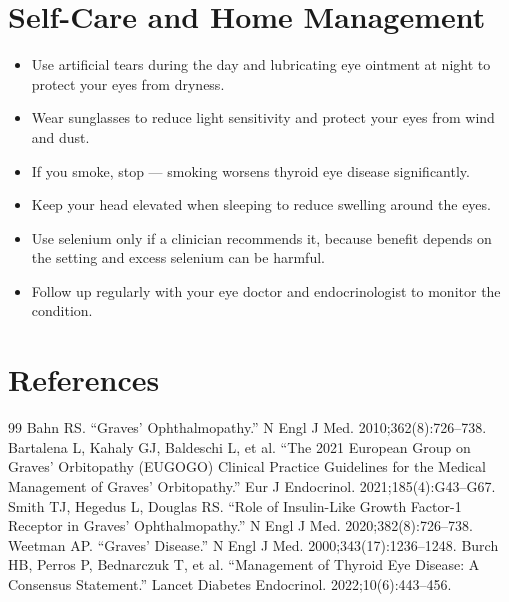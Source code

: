 \section*{Self-Care and Home Management}
\begin{itemize}
  \item Use artificial tears during the day and lubricating eye ointment at night to protect your eyes from dryness.
  \item Wear sunglasses to reduce light sensitivity and protect your eyes from wind and dust.
  \item If you smoke, stop — smoking worsens thyroid eye disease significantly.
  \item Keep your head elevated when sleeping to reduce swelling around the eyes.
  \item Use selenium only if a clinician recommends it, because benefit depends on the setting and excess selenium can be harmful.
  \item Follow up regularly with your eye doctor and endocrinologist to monitor the condition.
\end{itemize}

\section*{References}
\begin{thebibliography}{99}
 Bahn RS. ``Graves' Ophthalmopathy.'' N Engl J Med. 2010;362(8):726--738.
 Bartalena L, Kahaly GJ, Baldeschi L, et al. ``The 2021 European Group on Graves' Orbitopathy (EUGOGO) Clinical Practice Guidelines for the Medical Management of Graves' Orbitopathy.'' Eur J Endocrinol. 2021;185(4):G43--G67.
 Smith TJ, Hegedus L, Douglas RS. ``Role of Insulin-Like Growth Factor-1 Receptor in Graves' Ophthalmopathy.'' N Engl J Med. 2020;382(8):726--738.
 Weetman AP. ``Graves' Disease.'' N Engl J Med. 2000;343(17):1236--1248.
 Burch HB, Perros P, Bednarczuk T, et al. ``Management of Thyroid Eye Disease: A Consensus Statement.'' Lancet Diabetes Endocrinol. 2022;10(6):443--456.
\end{thebibliography}
